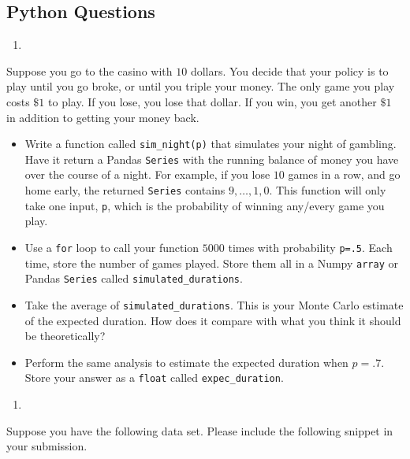 \documentclass[
  12pt,
  krantz2]{krantz}
\providecommand{\tightlist}{%
  \setlength{\itemsep}{0pt}\setlength{\parskip}{0pt}}
\begin{document}
\hypertarget{python-questions-8}{%
\subsection{Python Questions}\label{python-questions-8}}

\begin{enumerate}
\def\labelenumi{\arabic{enumi}.}
\tightlist
\item
\end{enumerate}

Suppose you go to the casino with \(10\) dollars. You decide that your policy is to play until you go broke, or until you triple your money. The only game you play costs \(\$1\) to play. If you lose, you lose that dollar. If you win, you get another \(\$1\) in addition to getting your money back.

\begin{itemize}
\tightlist
\item
  Write a function called \texttt{sim\_night(p)} that simulates your night of gambling. Have it return a Pandas \texttt{Series} with the running balance of money you have over the course of a night. For example, if you lose \(10\) games in a row, and go home early, the returned \texttt{Series} contains \(9, \ldots, 1,0\). This function will only take one input, \texttt{p}, which is the probability of winning any/every game you play.
\item
  Use a \texttt{for} loop to call your function \(5000\) times with probability \texttt{p=.5}. Each time, store the number of games played. Store them all in a Numpy \texttt{array} or Pandas \texttt{Series} called \texttt{simulated\_durations}.
\item
  Take the average of \texttt{simulated\_durations}. This is your Monte Carlo estimate of the expected duration. How does it compare with what you think it should be theoretically?
\item
  Perform the same analysis to estimate the expected duration when \(p=.7\). Store your answer as a \texttt{float} called \texttt{expec\_duration}.
\end{itemize}

\begin{enumerate}
\def\labelenumi{\arabic{enumi}.}
\setcounter{enumi}{1}
\tightlist
\item
\end{enumerate}

Suppose you have the following data set. Please include the following snippet in your submission.
\end{document}
